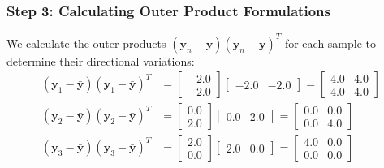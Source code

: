 \documentclass{article}
\begin{document}
\subsubsection{Step 3: Calculating Outer Product Formulations}
We calculate the outer products $(\mathbf{y}_n - \bar{\mathbf{y}})(\mathbf{y}_n - \bar{\mathbf{y}})^T$ for each sample to determine their directional variations:
\begin{align}
(\mathbf{y}_1 - \bar{\mathbf{y}})(\mathbf{y}_1 - \bar{\mathbf{y}})^T &= \begin{bmatrix} -2.0 \\ -2.0 \end{bmatrix} \begin{bmatrix} -2.0 & -2.0 \end{bmatrix} = \begin{bmatrix} 4.0 & 4.0 \\ 4.0 & 4.0 \end{bmatrix} \\
(\mathbf{y}_2 - \bar{\mathbf{y}})(\mathbf{y}_2 - \bar{\mathbf{y}})^T &= \begin{bmatrix} 0.0 \\ 2.0 \end{bmatrix} \begin{bmatrix} 0.0 & 2.0 \end{bmatrix} = \begin{bmatrix} 0.0 & 0.0 \\ 0.0 & 4.0 \end{bmatrix} \\
(\mathbf{y}_3 - \bar{\mathbf{y}})(\mathbf{y}_3 - \bar{\mathbf{y}})^T &= \begin{bmatrix} 2.0 \\ 0.0 \end{bmatrix} \begin{bmatrix} 2.0 & 0.0 \end{bmatrix} = \begin{bmatrix} 4.0 & 0.0 \\ 0.0 & 0.0 \end{bmatrix}
\end{align}
\end{document}
